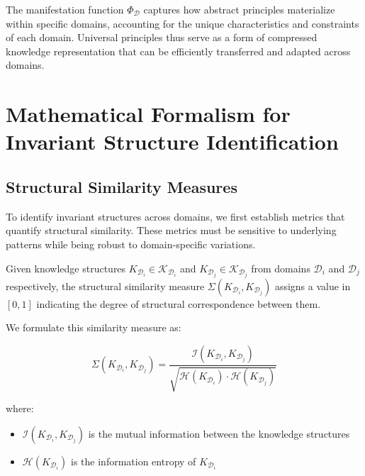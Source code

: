 The manifestation function $\Phi_{\mathcal{D}}$ captures how abstract principles materialize within specific domains, accounting for the unique characteristics and constraints of each domain. Universal principles thus serve as a form of compressed knowledge representation that can be efficiently transferred and adapted across domains.

\section{Mathematical Formalism for Invariant Structure Identification}



\subsection{Structural Similarity Measures}

To identify invariant structures across domains, we first establish metrics that quantify structural similarity. These metrics must be sensitive to underlying patterns while being robust to domain-specific variations.

\begin{definition}
Given knowledge structures $K_{\mathcal{D}_i} \in \mathcal{K}_{\mathcal{D}_i}$ and $K_{\mathcal{D}_j} \in \mathcal{K}_{\mathcal{D}_j}$ from domains $\mathcal{D}_i$ and $\mathcal{D}_j$ respectively, the structural similarity measure $\Sigma(K_{\mathcal{D}_i}, K_{\mathcal{D}_j})$ assigns a value in $[0,1]$ indicating the degree of structural correspondence between them.
\end{definition}

We formulate this similarity measure as:

\begin{equation}
\Sigma(K_{\mathcal{D}_i}, K_{\mathcal{D}_j}) = \frac{\mathcal{I}(K_{\mathcal{D}_i}, K_{\mathcal{D}_j})}{\sqrt{\mathcal{H}(K_{\mathcal{D}_i}) \cdot \mathcal{H}(K_{\mathcal{D}_j})}}
\end{equation}

where:
\begin{itemize}
    \item $\mathcal{I}(K_{\mathcal{D}_i}, K_{\mathcal{D}_j})$ is the mutual information between the knowledge structures
    \item $\mathcal{H}(K_{\mathcal{D}_i})$ is the information entropy of $K_{\mathcal{D}_i}$
\end{itemize}

